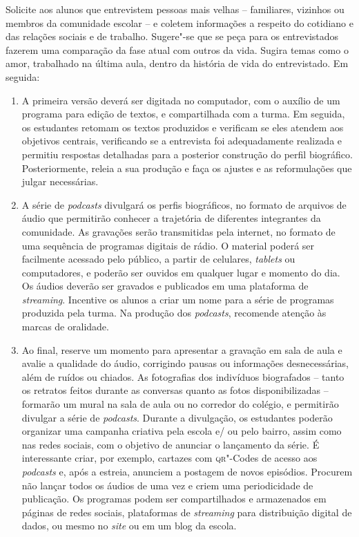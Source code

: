 \documentclass[11pt]{extarticle}
\begin{document}
    Solicite aos alunos que
entrevistem pessoas mais velhas -- familiares, vizinhos ou membros da
comunidade escolar -- e coletem informações a respeito do cotidiano e
das relações sociais e de trabalho. Sugere"-se que se peça para os
entrevistados fazerem uma comparação da fase atual com outros da vida. Sugira 
temas como o amor, trabalhado na última aula, dentro da história
de vida do entrevistado. Em seguida: 
   \begin{enumerate}

  \item
  A primeira versão deverá ser digitada no computador, com o auxílio de um
programa para edição de textos, e compartilhada com a turma. Em seguida,
os estudantes retomam os textos produzidos e verificam se eles atendem
aos objetivos centrais, verificando se a entrevista foi adequadamente
realizada e permitiu respostas detalhadas para a posterior construção do
perfil biográfico. Posteriormente, releia a sua produção e faça os
ajustes e as reformulações que julgar necessárias.

  \item
A série de \emph{podcasts} divulgará os perfis biográficos, no formato
de arquivos de áudio que permitirão conhecer a trajetória de diferentes
integrantes da comunidade. As gravações serão transmitidas pela
internet, no formato de uma sequência de programas digitais de rádio. O
material poderá ser facilmente acessado pelo público, a partir de
celulares, \emph{tablets} ou computadores, e poderão ser ouvidos em
qualquer lugar e momento do dia. Os áudios deverão ser gravados e
publicados em uma plataforma de \textit{streaming}. Incentive os alunos a criar
um nome para a série de programas produzida pela turma. Na produção dos
\emph{podcasts}, recomende atenção às marcas de oralidade.


  \item
  Ao final, reserve um momento para apresentar a gravação em sala de aula
e avalie a qualidade do áudio, corrigindo pausas ou informações
desnecessárias, além de ruídos ou chiados. As fotografias dos indivíduos
biografados -- tanto os retratos feitos durante as conversas quanto as
fotos disponibilizadas -- formarão um mural na sala de aula ou no
corredor do colégio, e permitirão divulgar a série de \emph{podcasts}.
Durante a divulgação, os estudantes poderão organizar uma campanha
criativa pela escola e/ ou pelo bairro, assim como nas redes sociais,
com o objetivo de anunciar o lançamento da série. É interessante criar,
por exemplo, cartazes com \textsc{qr}"-Codes de acesso aos \emph{podcasts} e, após
a estreia, anunciem a postagem de novos episódios. Procurem não lançar
todos os áudios de uma vez e criem uma periodicidade de publicação. Os
programas podem ser compartilhados e armazenados em páginas de redes
sociais, plataformas de \textit{streaming} para distribuição digital de dados, ou
mesmo no \emph{site} ou em um blog da escola.

   \end{enumerate}
\end{document}
